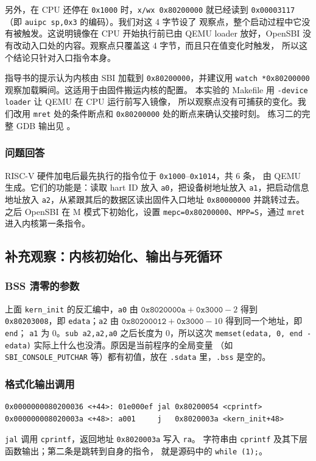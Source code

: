 \documentclass[UTF8,a4paper,10pt,fontset=none]{ctexart}
\begin{document}
另外，在 CPU 还停在 \texttt{0x1000} 时，\texttt{x/wx 0x80200000} 就已经读到
\texttt{0x00003117}（即 \texttt{auipc sp,0x3} 的编码）。我们对这 4 字节设了
观察点，整个启动过程中它没有被触发。这说明镜像在 CPU 开始执行前已由 QEMU loader
放好，OpenSBI 没有改动入口处的内容。观察点只覆盖这 4 字节，而且只在值变化时触发，
所以这个结论只针对入口指令本身\cite{gdb-watch}。

指导书\cite{lab-guide}的提示认为内核由 SBI 加载到 \texttt{0x80200000}，并建议用
\texttt{watch *0x80200000} 观察加载瞬间。这适用于由固件搬运内核的配置。
本实验的 Makefile 用 \texttt{-device loader} 让 QEMU 在 CPU 运行前写入镜像\cite{qemu-loader}，
所以观察点没有可捕获的变化。我们改用 \texttt{mret} 处的条件断点和
\texttt{0x80200000} 处的断点来确认交接时刻。
练习二的完整 GDB 输出见 。

\subsubsection{问题回答}
RISC-V 硬件加电后最先执行的指令位于 \texttt{0x1000}--\texttt{0x1014}，共 6 条，
由 QEMU 生成。它们的功能是：读取 hart ID 放入 \texttt{a0}，把设备树地址放入
\texttt{a1}，把启动信息地址放入 \texttt{a2}，从紧跟其后的数据区读出固件入口地址
\texttt{0x80000000} 并跳转过去。之后 OpenSBI 在 M 模式下初始化，设置
\texttt{mepc=0x80200000}、\texttt{MPP=S}，通过 \texttt{mret} 进入内核第一条指令。

\subsection{补充观察：内核初始化、输出与死循环}
\subsubsection{BSS 清零的参数}
上面 \texttt{kern\_init} 的反汇编中，\texttt{a0} 由 $\texttt{0x8020000a} + \texttt{0x3000} - 2$
得到 \texttt{0x80203008}，即 \texttt{edata}；\texttt{a2} 由
$\texttt{0x80200012} + \texttt{0x3000} - 10$ 得到同一个地址，即 \texttt{end}；
\texttt{a1} 为 0。\texttt{sub a2,a2,a0} 之后长度为 0，所以这次
\texttt{memset(edata, 0, end - edata)} 实际上什么也没清。原因是当前程序的全局变量
（如 \texttt{SBI\_CONSOLE\_PUTCHAR} 等）都有初值，放在 \texttt{.sdata} 里，\texttt{.bss} 是空的。

\subsubsection{格式化输出调用}
\begin{verbatim}
0x0000000080200036 <+44>: 01e000ef jal 0x80200054 <cprintf>
0x000000008020003a <+48>: a001     j   0x8020003a <kern_init+48>
\end{verbatim}
\texttt{jal} 调用 \texttt{cprintf}，返回地址 \texttt{0x8020003a} 写入 \texttt{ra}。
字符串由 \texttt{cprintf} 及其下层函数输出；第二条是跳转到自身的指令，
就是源码中的 \texttt{while (1);}。
\end{document}
